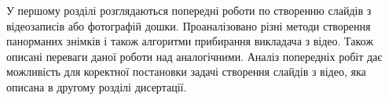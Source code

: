 У першому розділі розглядаються попередні роботи
по створенню слайдів з відеозаписів або фотографій дошки.
Проаналізовано різні методи створення панорманих знімків
і також алгоритми прибирання викладача з відео. Також 
описані переваги даної роботи над аналогічними. 
Аналіз попередніх робіт дає можливість для коректної 
постановки задачі створення слайдів з відео, яка описана 
в другому розділі дисертації.